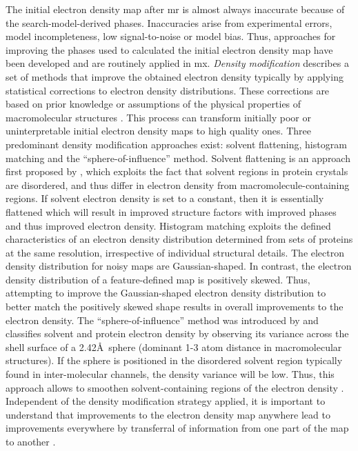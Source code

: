 The initial electron density map after \gls{mr} is almost always inaccurate because of the search-model-derived phases. Inaccuracies arise from experimental errors, model incompleteness, low signal-to-noise or model bias. Thus, approaches for improving the phases used to calculated the initial electron density map have been developed and are routinely applied in \gls{mx}. \textit{Density modification} describes a set of methods that improve the obtained electron density typically by applying statistical corrections to electron density distributions. These corrections are based on prior knowledge or assumptions of the physical properties of macromolecular structures \cite{Rupp2010-nc}. This process can transform initially poor or uninterpretable initial electron density maps to high quality ones. Three predominant density modification approaches exist: solvent flattening, histogram matching and the ``sphere-of-influence'' method. Solvent flattening is an approach first proposed by \textcite{Wang1985-zu}, which exploits the fact that solvent regions in protein crystals are disordered, and thus differ in electron density from macromolecule-containing regions. If solvent electron density is set to a constant, then it is essentially flattened which will result in improved structure factors with improved phases and thus improved electron density. Histogram matching \cite{Lunin1988-lx} exploits the defined characteristics of an electron density distribution determined from sets of proteins at the same resolution, irrespective of individual structural details. The electron density distribution for noisy maps are Gaussian-shaped. In contrast, the electron density distribution of a feature-defined map is positively skewed. Thus, attempting to improve the Gaussian-shaped electron density distribution to better match the positively skewed shape results in overall improvements to the electron density. The ``sphere-of-influence'' method was introduced by \textcite{Sheldrick2002-tx} and classifies solvent and protein electron density by observing its variance across the shell surface of a 2.42\AA\ sphere (dominant 1-3 atom distance in macromolecular structures). If the sphere is positioned in the disordered solvent region typically found in inter-molecular channels, the density variance will be low. Thus, this approach allows to smoothen solvent-containing regions of the electron density \cite{Sheldrick2002-tx}. Independent of the density modification strategy applied, it is important to understand that improvements to the electron density map anywhere lead to improvements everywhere by transferral of information from one part of the map to another \cite{Terwilliger2000-sz}.


